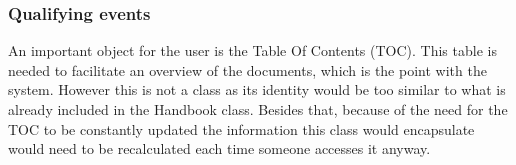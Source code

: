 \subsubsection{Qualifying events}

An important object for the user is the Table Of Contents (TOC). 
This table is needed to facilitate an overview of the documents, which is the point with the system. 
However this is not a class as its identity would be too similar to what is already included in the Handbook class. 
Besides that, because of the need for the TOC to be constantly updated the information this class would encapsulate would need to be recalculated each time someone accesses it anyway.
